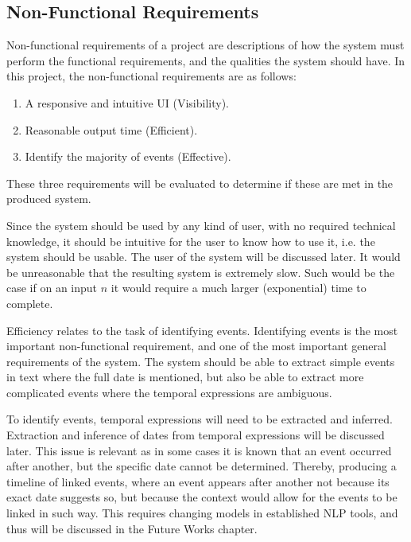 \subsection{Non-Functional Requirements}
\par Non-functional requirements of a project are descriptions of how the system must perform the functional requirements, and the qualities the system should have. In this project, the non-functional requirements are as follows:
\begin{enumerate}
\item A responsive and intuitive UI (Visibility).
\item Reasonable output time (Efficient).
\item Identify the majority of events (Effective).
\end{enumerate}
\par These three requirements will be evaluated to determine if these are met in the produced system. 
\par Since the system should be used by any kind of user, with no required technical knowledge, it should be intuitive for the user to know how to use it, i.e. the system should be usable. The user of the system will be discussed later. It would be unreasonable that the resulting system is extremely slow. Such would be the case if on an input $n$ it would require a much larger (exponential) time to complete. 
\par Efficiency relates to the task of identifying events. Identifying events is the most important non-functional requirement, and one of the most important general requirements of the system. The system should be able to extract simple events in text where the full date is mentioned, but also be able to extract more complicated events where the temporal expressions are ambiguous. 
\par To identify events, temporal expressions will need to be extracted and inferred. Extraction and inference of dates from temporal expressions will be discussed later. This issue is relevant as in some cases it is known that an event occurred after another, but the specific date cannot be determined. Thereby, producing a timeline of linked events, where an event appears after another not because its exact date suggests so, but because the context would allow for the events to be linked in such way. This requires changing models in established NLP tools, and thus will be discussed in the Future Works chapter.

